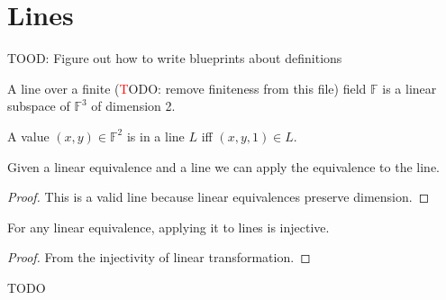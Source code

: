 \chapter{Lines}
\label{chap:line}

TOOD: Figure out how to write blueprints about definitions

\begin{definition}
    \label{Line}
    \leanok
    A line over a finite ({\textcolor{red} TODO: remove finiteness from this file}) field $\mathbb{F}$ is a
    linear subspace of $\mathbb{F}^3$ of dimension 2.
\end{definition}

\begin{definition}
    \label{Line_mem}
    \leanok
    A value $(x, y) \in \mathbb{F}^2$ is in a line $L$ iff $(x, y, 1) \in L$.
\end{definition}

\begin{definition}
    \label{line_apply}
    \leanok
    Given a linear equivalence and a line we can apply the equivalence to the line.
\end{definition}

\begin{proof}
    \leanok
    This is a valid line because linear equivalences preserve dimension.
\end{proof}

\begin{lemma}
    \label{apply_injective}
    \leanok
    For any linear equivalence, applying it to lines is injective.
\end{lemma}

\begin{proof}
    \leanok
    From the injectivity of linear transformation.
\end{proof}

TODO